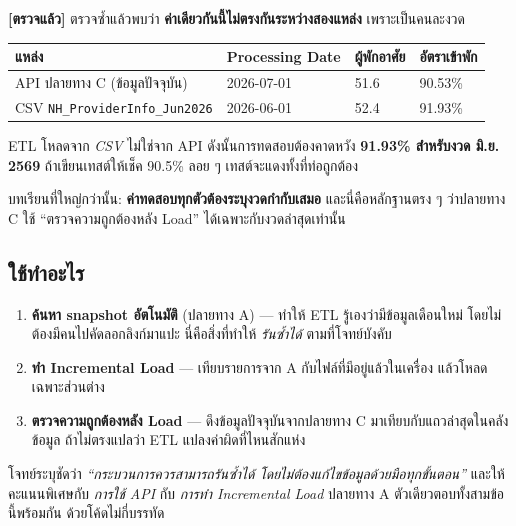 \documentclass[11pt,a4paper]{article}
\newcommand{\sansall}{\sffamily}
\newcommand{\code}[1]{\texttt{#1}}
\newcommand{\ok}{\textcolor{dw}{\textbf{[ตรวจแล้ว]}}}
\begin{document}
\begin{badbox}[title={กับดัก: แถวทดสอบนี้ผูกกับ ``งวด'' ห้ามใช้ลอย ๆ}]
\ok{} ตรวจซ้ำแล้วพบว่า \textbf{ค่าเดียวกันนี้ไม่ตรงกันระหว่างสองแหล่ง}
เพราะเป็นคนละงวด

\vspace{0.3em}
\begin{tabular}{@{}L{5.6cm} L{2.6cm} L{2.4cm} L{2.4cm}@{}}
\toprule
\sansall\bfseries แหล่ง & \sansall\bfseries Processing Date &
\sansall\bfseries ผู้พักอาศัย & \sansall\bfseries อัตราเข้าพัก \\
\midrule
API ปลายทาง C (ข้อมูลปัจจุบัน) & 2026-07-01 & 51.6 & 90.53\% \\
CSV \code{NH_ProviderInfo_Jun2026} & 2026-06-01 & 52.4 & 91.93\% \\
\bottomrule
\end{tabular}

\vspace{0.5em}
ETL โหลดจาก \emph{CSV} ไม่ใช่จาก API ดังนั้นการทดสอบต้องคาดหวัง
\textbf{91.93\% สำหรับงวด มิ.ย. 2569} ถ้าเขียนเทสต์ให้เช็ค 90.5\% ลอย ๆ
เทสต์จะแดงทั้งที่ท่อถูกต้อง

\vspace{0.3em}
บทเรียนที่ใหญ่กว่านั้น: \textbf{ค่าทดสอบทุกตัวต้องระบุงวดกำกับเสมอ}
และนี่คือหลักฐานตรง ๆ ว่าปลายทาง C ใช้ ``ตรวจความถูกต้องหลัง Load''
ได้เฉพาะกับงวดล่าสุดเท่านั้น
\end{badbox}

\subsection{ใช้ทำอะไร}
\begin{enumerate}
\item \textbf{ค้นหา snapshot อัตโนมัติ} (ปลายทาง A) --- ทำให้ ETL รู้เองว่ามีข้อมูลเดือนใหม่
      โดยไม่ต้องมีคนไปคัดลอกลิงก์มาแปะ นี่คือสิ่งที่ทำให้ \emph{รันซ้ำได้} ตามที่โจทย์บังคับ
\item \textbf{ทำ Incremental Load} --- เทียบรายการจาก A กับไฟล์ที่มีอยู่แล้วในเครื่อง
      แล้วโหลดเฉพาะส่วนต่าง
\item \textbf{ตรวจความถูกต้องหลัง Load} --- ดึงข้อมูลปัจจุบันจากปลายทาง C
      มาเทียบกับแถวล่าสุดในคลังข้อมูล ถ้าไม่ตรงแปลว่า ETL แปลงค่าผิดที่ไหนสักแห่ง
\end{enumerate}

\begin{keybox}[title={API คือสิ่งที่แยก ``ไปป์ไลน์'' ออกจาก ``การดาวน์โหลดด้วยมือ''}]
โจทย์ระบุชัดว่า \emph{``กระบวนการควรสามารถรันซ้ำได้ โดยไม่ต้องแก้ไขข้อมูลด้วยมือทุกขั้นตอน''}
และให้คะแนนพิเศษกับ \emph{การใช้ API} กับ \emph{การทำ Incremental Load}
ปลายทาง A ตัวเดียวตอบทั้งสามข้อนี้พร้อมกัน ด้วยโค้ดไม่กี่บรรทัด
\end{keybox}
\end{document}
